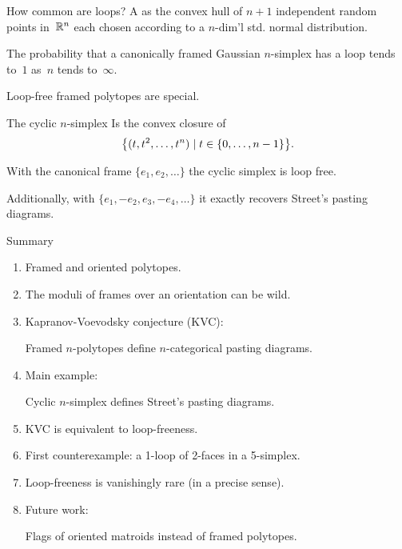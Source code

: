 \begin{frame}{How common are loops?}
	\pause
	A  as the convex hull of $n+1$ independent random points in~$\R^n$ each chosen according to a $n$-dim'l std. normal distribution.

	\pause\medskip
	 The probability that a canonically framed Gaussian $n$-simplex has a loop tends to~$1$ as~$n$ tends to~$\infty$.

	\pause\medskip
	 Loop-free framed polytopes are special.
\end{frame}

\begin{frame}{The cyclic $n$-simplex}
	\pause
	Is the convex closure of
	\[
	\set[\big]{(t,t^2,\dots,t^n) \mid t \in \{0,\dots,n-1\}}.
	\]

	\pause

	\smallskip
	With the canonical frame $\{e_1,e_2,\dots\}$ the cyclic simplex is loop free.

	\pause\smallskip
	Additionally, with $\{e_1,-e_2,e_3,-e_4,\dots\}$ it exactly recovers Street's pasting diagrams.
\end{frame}

\begin{frame}{Summary}
	\pause
	\begin{enumerate}
		\item\pause Framed and oriented polytopes.
		\item\pause The moduli of frames over an orientation can be wild.
		\item\pause Kapranov-Voevodsky conjecture (KVC):

		\smallskip
		Framed $n$-polytopes define $n$-categorical pasting diagrams.

		\item\pause Main example:

		\smallskip
		Cyclic $n$-simplex defines Street's pasting diagrams.

		\item\pause KVC is equivalent to loop-freeness.

		\item\pause First counterexample: a 1-loop of 2-faces in a 5-simplex.

		\item\pause Loop-freeness is vanishingly rare (in a precise sense).

		\item\pause Future work:

		\smallskip
		Flags of oriented matroids instead of framed polytopes.
	\end{enumerate}
\end{frame}

